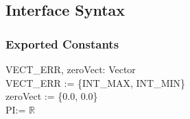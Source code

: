 \documentclass[12pt]{article}
\begin{document}
\subsection{Interface Syntax}

\subsubsection{Exported Constants} \label{SecECVector}
	VECT_ERR, zeroVect: Vector \\
	VECT_ERR := \{INT_MAX, INT_MIN\} \\
	zeroVect := \{0.0, 0.0\}\\
	PI:= $\mathbb{R}$\\
	

\end{document}
